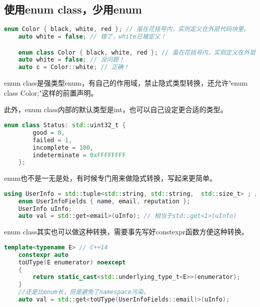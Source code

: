 \subsection{使用enum class，少用enum}
\begin{lstlisting}[language=C++]
    enum Color { black, white, red }; // 虽在花括号内，实则定义在外层代码块里。
    auto white = false; // 错了，white已被定义！

    enum class Color { black, white, red }; // 虽在花括号内，实则定义在外层代码块里。
    auto white = false; // 没问题！
    auto c = Color::white; // 正确！
\end{lstlisting}

enum class是强类型enum，有自己的作用域，禁止隐式类型转换，还允许"enum class Color;"这样的前置声明。

此外，enum class内部的默认类型是int，也可以自己设定更合适的类型。
\begin{lstlisting}[language=C++]
    enum class Status: std::uint32_t { 
        good = 0,
        failed = 1,
        incomplete = 100,
        indeterminate = 0xFFFFFFFF
    };
\end{lstlisting}

enum也不是一无是处，有时候专门用来做隐式转换，写起来更简单。
\begin{lstlisting}[language=C++]
    using UserInfo = std::tuple<std::string, std::string,  std::size_t> ; // name, email, reputation
    enum UserInfoFields { name, email, reputation };
    UserInfo uInfo; 
    auto val = std::get<email>(uInfo); // 相当于std::get<1>(uInfo)
\end{lstlisting}

enum class其实也可以做这种转换，需要事先写好constexpr函数方便这种转换。
\begin{lstlisting}[language=C++]
    template<typename E> // C++14
    constexpr auto
    toUType(E enumerator) noexcept
    {
        return static_cast<std::underlying_type_t<E>>(enumerator);
    }
    //还是比enum长，但是避免了namespace污染。
    auto val = std::get<toUType(UserInfoFields::email)>(uInfo);
\end{lstlisting}

